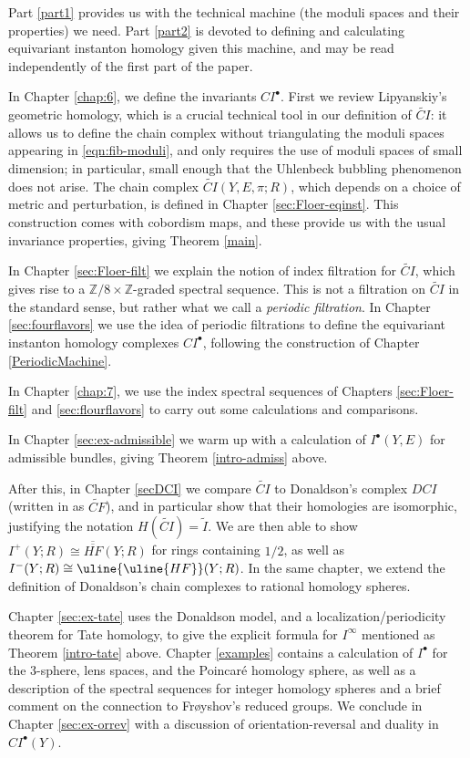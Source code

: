 \documentclass{memo-l}
\theoremstyle{definition}
\theoremstyle{remark}
\numberwithin{section}{chapter}
\numberwithin{equation}{chapter}
\begin{document}
Part \ref{part1} provides us with the technical machine (the moduli spaces and their properties) we need. Part \ref{part2} is devoted to defining and calculating equivariant instanton homology given this machine, and may be read independently of the first part of the paper.

In Chapter \ref{chap:6}, we define the invariants $CI^\bullet$. First we review Lipyanskiy's geometric homology, which is a crucial technical tool in our definition of $\widetilde{CI}$: it allows us to define the chain complex without triangulating the moduli spaces appearing in \eqref{eqn:fib-moduli}, and only requires the use of moduli spaces of small dimension; in particular, small enough that the Uhlenbeck bubbling phenomenon does not arise. The chain complex $\widetilde{CI}(Y,E,\pi;R)$, which depends on a choice of metric and perturbation, is defined in Chapter \ref{sec:Floer-eqinst}. This construction comes with cobordism maps, and these provide us with the usual invariance properties, giving Theorem \ref{main}.

In Chapter \ref{sec:Floer-filt} we explain the notion of index filtration for $\widetilde{CI}$, which gives rise to a $\mathbb Z/8 \times \mathbb Z$-graded spectral sequence. This is not a filtration on $\widetilde{CI}$ in the standard sense, but rather what we call a \emph{periodic filtration}. In Chapter \ref{sec:fourflavors} we use the idea of periodic filtrations to define the equivariant instanton homology complexes $CI^\bullet$, following the construction of Chapter \ref{PeriodicMachine}. 

In Chapter \ref{chap:7}, we use the index spectral sequences of Chapters \ref{sec:Floer-filt} and \ref{sec:flourflavors} to carry out some calculations and comparisons.

In Chapter \ref{sec:ex-admissible} we warm up with a calculation of $I^\bullet(Y,E)$ for admissible bundles, giving Theorem \ref{intro-admiss} above. 

After this, in Chapter \ref{secDCI} we compare $\widetilde{CI}$ to Donaldson's complex $DCI$ (written in \cite{Don} as $\widetilde{CF}$), and in particular show that their homologies are isomorphic, justifying the notation $H(\widetilde{CI}) = \widetilde I$. We are then able to show $I^+(Y;R) \cong \overline{\overline{HF}}(Y;R)$ for rings containing $1/2$, as well as $I^-(Y;R) \cong \uline{\uline{HF}}(Y;R)$. In the same chapter, we extend the definition of Donaldson's chain complexes to rational homology spheres. 

Chapter \ref{sec:ex-tate} uses the Donaldson model, and a localization/periodicity theorem for Tate homology, to give the explicit formula for $I^\infty$ mentioned as Theorem \ref{intro-tate} above. Chapter \ref{examples} contains a calculation of $I^\bullet$ for the 3-sphere, lens spaces, and the Poincar\'e homology sphere, as well as a description of the spectral sequences for integer homology spheres and a brief comment on the connection to Fr\o yshov's reduced groups. We conclude in Chapter \ref{sec:ex-orrev} with a discussion of orientation-reversal and duality in $CI^\bullet(Y)$. 
\end{document}
